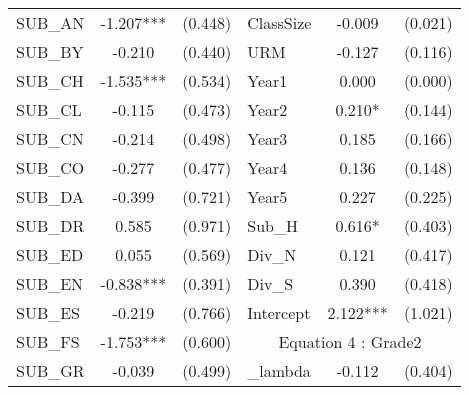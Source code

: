 \begin{table}[H]
\begin{threeparttable}
\begin{tabular}{l c c|l c c }
    SUB\_AN                                      & -1.207***                 & (0.448)              & ClassSize           & -0.009                 & (0.021)              \\
    SUB\_BY                                      & -0.210                    & (0.440)              & URM                 & -0.127                 & (0.116)              \\
    SUB\_CH                                      & -1.535***                 & (0.534)              & Year1               & 0.000                  & (0.000)              \\
    SUB\_CL                                      & -0.115                    & (0.473)              & Year2               & 0.210*                 & (0.144)              \\
    SUB\_CN                                      & -0.214                    & (0.498)              & Year3               & 0.185                  & (0.166)              \\
    SUB\_CO                                      & -0.277                    & (0.477)              & Year4               & 0.136                  & (0.148)              \\
    SUB\_DA                                      & -0.399                    & (0.721)              & Year5               & 0.227                  & (0.225)              \\
    SUB\_DR                                      & 0.585                     & (0.971)              & Sub\_H              & 0.616*                 & (0.403)              \\
    SUB\_ED                                      & 0.055                     & (0.569)              & Div\_N              & 0.121                  & (0.417)              \\
    SUB\_EN                                      & -0.838***                 & (0.391)              & Div\_S              & 0.390                  & (0.418)              \\
    SUB\_ES                                      & -0.219                    & (0.766)              & Intercept           & 2.122***               & (1.021)              \\
    \cline{4-6}
    SUB\_FS                                      & -1.753***                 & (0.600)              & \multicolumn{3}{c}{Equation 4 : Grade2}                             \\
    \cline{4-6}
    SUB\_GR                                      & -0.039                    & (0.499)              & \_lambda            & -0.112                 & (0.404)              \\

\end{tabular}
\end{threeparttable}
\end{table}
